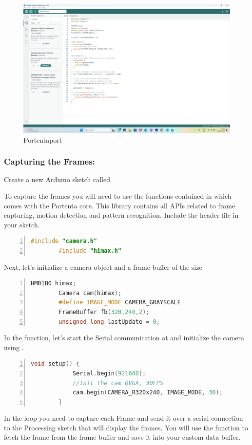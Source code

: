 	\begin{figure}
		\begin{center}
			\includegraphics[width=0.7\linewidth]{Images/PortentaH7/Portentaport.png}
			\caption{Portentaport}
			\label{Portentaport}
		\end{center}
	\end{figure}
	
	\subsubsection{Capturing the Frames:} Create a new Arduino sketch called 
	
	To capture the frames you will need to use the functions contained in  which comes with the Portenta core. This library contains all APIs related to frame capturing, motion detection and pattern recognition. Include the header file in your sketch.
	
	
	\begin{lstlisting}[language=C++, frame=single, numbers=left, basicstyle=\ttfamily\small]
		#include "camera.h"
		#include "himax.h"
	\end{lstlisting}
	Next, let's initialize a camera object and a frame buffer of the size 
	
	\begin{lstlisting}[language=C++, frame=single, numbers=left, basicstyle=\ttfamily\small]
		HM01B0 himax;
		Camera cam(himax);
		#define IMAGE_MODE CAMERA_GRAYSCALE
		FrameBuffer fb(320,240,2);
		unsigned long lastUpdate = 0;
	\end{lstlisting}
	
	In the  function, let's start the Serial communication at  and initialize the camera using .
	
	\begin{lstlisting}[language=C++, frame=single, numbers=left, basicstyle=\ttfamily\small]
		void setup() {
			Serial.begin(921600);
			//Init the cam QVGA, 30FPS
			cam.begin(CAMERA_R320x240, IMAGE_MODE, 30);
		}
	\end{lstlisting}
	In the loop you need to capture each Frame and send it over a serial connection to the Processing sketch that will display the frames. You will use the function to fetch the frame from the frame buffer and save it into your custom data buffer.
	
